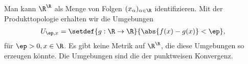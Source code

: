 \begin{bemn}[Bemerkung zu $\R^\R$.]
Man kann $\R^\R$ als Menge von Folgen $(x_\alpha)_{\alpha\in\R}$
identifizieren. Mit der Produkttopologie erhalten wir die Umgebungen
\begin{align*}
U_{\ep,x} = \setdef{g:\R\to\R}{\abs{f(x)-g(x)}<\ep},
\end{align*}
für $\ep > 0, x\in\R$. Es gibt keine Metrik auf $\R^\R$, die diese Umgebungen so
erzeugen könnte. Die Umgebungen sind die der punktweisen Konvergenz.\maphere
\end{bemn}